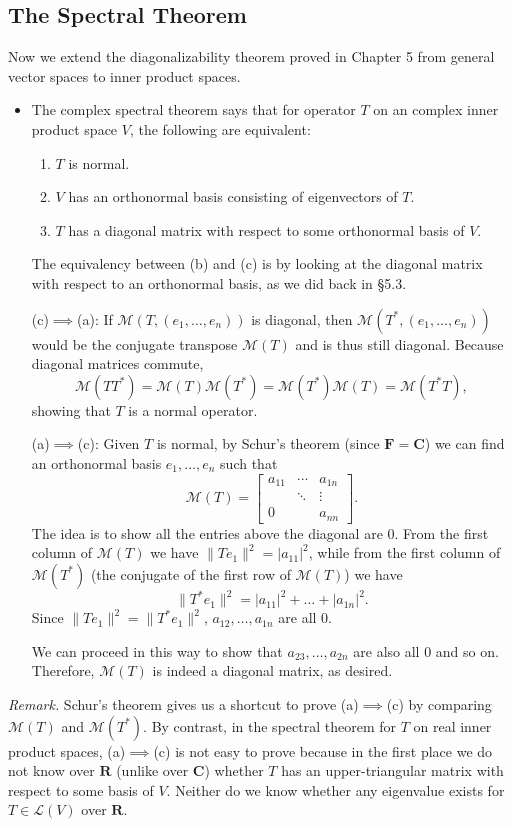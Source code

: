 \documentclass{article}
\newcommand{\R}{\mathbf{R}}
\newcommand{\C}{\mathbf{C}}
\newcommand{\F}{\mathbf{F}}
\newcommand{\nm}[1]{\| #1 \|}
\newcommand{\LV}{\mathcal{L}(V)}
\newcommand{\M}{\mathcal{M}}
\begin{document}
\subsection{The Spectral Theorem}
Now we extend the diagonalizability theorem proved in Chapter 5 from general vector spaces to inner product spaces. 
\begin{itemize}
    \item The complex spectral theorem says that for operator $T$ on an complex inner product space $V$, the following are equivalent:
    \begin{enumerate}[label=(\alph*)]
        \item $T$ is normal.
        \item $V$ has an orthonormal basis consisting of eigenvectors of $T$.
        \item $T$ has a diagonal matrix with respect to some orthonormal basis of $V$.
    \end{enumerate}
    
    The equivalency between (b) and (c) is by looking at the diagonal matrix with respect to an orthonormal basis, as we did back in \S 5.3.
    
    (c)$\implies$(a): If $\M(T,(e_1,\dots,e_n))$ is diagonal, then $\M(T^*,(e_1,\dots,e_n))$ would be the conjugate transpose $\M(T)$ and is thus still diagonal. Because diagonal matrices commute, $$\M(TT^*)=\M(T)\M(T^*)=\M(T^*)\M(T)=\M(T^*T),$$ showing that $T$ is a normal operator.
    
    (a)$\implies$(c): Given $T$ is normal, by Schur's theorem (since $\F = \C$) we can find an orthonormal basis $e_1,\dots,e_n$ such that
    \begin{equation*}
        \M(T)=
        \begin{bmatrix}
            a_{11} & \cdots & a_{1n} \\
            & \ddots & \vdots \\
            0 & & a_{nn}
        \end{bmatrix}.
    \end{equation*}
    The idea is to show all the entries above the diagonal are 0. From the first column of $\M(T)$ we have $\nm{Te_1}^2=|a_{11}|^2$, while from the first column of $\M(T^*)$ (the conjugate of the first row of $\M(T)$) we have $$\nm{T^*e_1}^2=|a_{11}|^2+\dots+|a_{1n}|^2.$$ Since $\nm{Te_1}^2 = \nm{T^*e_1}^2$, $a_{12},\dots,a_{1n}$ are all 0.
    
    We can proceed in this way to show that $a_{23},\dots,a_{2n}$ are also all 0 and so on. Therefore, $\M(T)$ is indeed a diagonal matrix, as desired.
\end{itemize}
\textit{Remark.} Schur's theorem gives us a shortcut to prove (a)$\implies$(c) by comparing $\M(T)$ and $\M(T^*)$. By contrast, in the spectral theorem for $T$ on real inner product spaces, (a)$\implies$(c) is not easy to prove because in the first place we do not know over $\R$ (unlike over $\C$) whether $T$ has an upper-triangular matrix with respect to some basis of $V$. Neither do we know whether any eigenvalue exists for $T \in \LV$ over $\R$.
\end{document}
